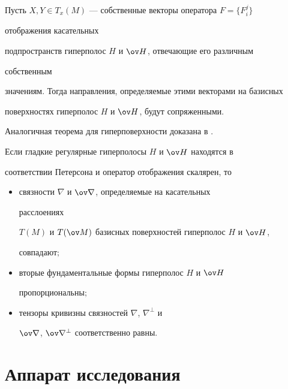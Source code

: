  


\begin{thm} 


Пусть $X,Y\in T_x(M)$ --- собственные векторы оператора $F=\{F^j_i\}$ 


отображения касательных 


подпространств гиперполос $H$ и $\ov H$, отвечающие его различным 


собственным 


значениям. Тогда направления, определяемые этими векторами на базисных 


поверхностях гиперполос $H$ и $\ov H$, будут сопряженными. 


\end{thm} 


 


Аналогичная теорема для гиперповерхности доказана в \cite{6}. 


 


\begin{thm} 


Если гладкие регулярные гиперполосы $H$ и $\ov H$ находятся в 


соответствии Петерсона и оператор отображения скалярен, то 


\begin{itemize} 


\item[1)] связности $\nabla$ и $\ov\nabla$, определяемые на касательных 


расслоениях 


$T(M)$ и $T(\ov M)$ базисных поверхностей гиперполос $H$ и $\ov H$, 


совпадают$;$ 


\item[2)] вторые фундаментальные формы гиперполос $H$ и $\ov H$ 


пропорциональны$;$ 


\item[3)] тензоры кривизны связностей $\nabla$, $\nabla^\bot$ и 


$\ov\nabla$, $\ov\nabla^\bot$ соответственно равны. 


\end{itemize} 


\end{thm} 


 


\section{Аппарат исследования} 


